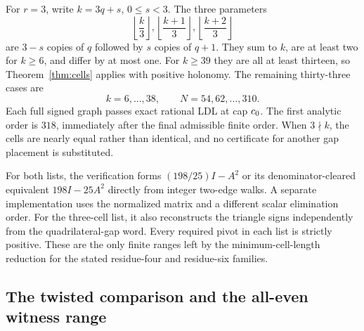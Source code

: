 For $r=3$, write $k=3q+s$, $0\le s<3$. The three parameters
\[
 \left\lfloor\frac{k}{3}\right\rfloor,
 \left\lfloor\frac{k+1}{3}\right\rfloor,
 \left\lfloor\frac{k+2}{3}\right\rfloor
\]
are $3-s$ copies of $q$ followed by $s$ copies of $q+1$.
They sum to $k$, are at least two for $k\ge6$, and differ by at most one.
For $k\ge39$ they are all at least thirteen, so Theorem~\ref{thm:cells}
applies with positive holonomy. The remaining thirty-three cases are
\begin{equation}
 k=6,\ldots,38,\qquad N=54,62,\ldots,310.
 \label{eq:R6finite}
\end{equation}
Each full signed graph passes exact rational LDL at cap $c_0$.
The first analytic order is $318$, immediately after the final admissible
finite order. When $3\nmid k$, the cells are nearly equal rather than
identical, and no certificate for another gap placement is substituted.

For both lists, the verification forms $(198/25)I-A^2$ or its
denominator-cleared equivalent $198I-25A^2$ directly from integer
two-edge walks. A separate implementation uses the normalized matrix and
a different scalar elimination order. For the three-cell list,
it also reconstructs the triangle signs independently from the
quadrilateral-gap word. Every required pivot in each list is strictly
positive. These are the only finite ranges left by the minimum-cell-length
reduction for the stated residue-four and residue-six families.

\subsection{The twisted comparison and the all-even witness range}

